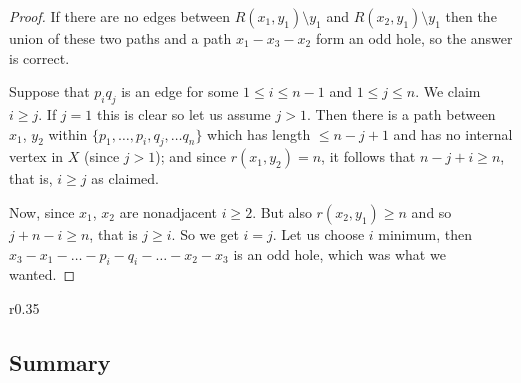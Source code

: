 \begin{proof}
	If there are no edges between $R(x_1, y_1) \setminus y_1$ and $R(x_2, y_1) \setminus y_1$ then the union of these two paths and a path $x_1-x_3-x_2$ form an odd hole, so the answer is correct.

	Suppose that $p_iq_j$ is an edge for some $1\leq i \leq n-1$ and $1 \leq j \leq n$. We claim $i \geq j$. If $j = 1$ this is clear so let us assume $j > 1$. Then there is a path between $x_1$, $y_2$ within $\{p_1, \ldots , p_i, q_j, \ldots q_n\}$ which has length $\leq n-j+1$ and has no internal vertex in $X$ (since $j > 1$); and since $r(x_1, y_2) = n$, it follows that $n-j+i \geq n$, that is, $i \geq j$ as claimed.

	Now, since $x_1$, $x_2$ are nonadjacent $i \geq 2$. But also $r(x_2, y_1) \geq n$ and so $j+n-i \geq n$, that is $j \geq i$. So we get $i=j$. Let us choose $i$ minimum, then $x_3-x_1-\ldots-p_i-q_i-\ldots-x_2-x_3$ is an odd hole, which was what we wanted.
\end{proof}

\begin{wrapfigure}{r}{0.35\textwidth}
	
\end{wrapfigure}


\subsection{Summary}

